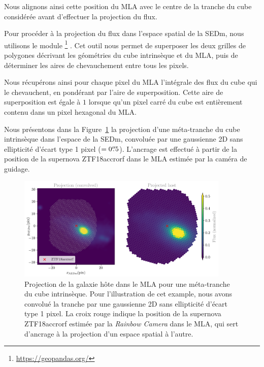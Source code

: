 \documentclass[../main/main.tex]{subfiles}
\begin{document}
Nous alignons ainsi cette position du MLA avec le centre de la tranche
du cube considérée avant d'effectuer la projection du flux.

Pour procéder à la projection du flux dans l'espace spatial de la SEDm,
nous utilisons le module
\footnote{\url{https://geopandas.org/}}
\citep{kelsey_jordahl_2020_3946761}.
Cet outil nous permet de superposer les deux grilles de polygones
décrivant les géométries du cube intrinsèque et du MLA, puis de
déterminer les aires de chevauchement entre tous les pixels. 

Nous récupérons ainsi pour chaque pixel du MLA l'intégrale des flux
du cube qui le chevauchent, en pondérant
par l'aire de superposition. Cette aire de superposition est égale à $1$
lorsque qu'un pixel carré du cube est entièrement contenu dans un pixel
hexagonal du MLA.

Nous présentons dans la Figure~\ref{fig:projecthost} la projection d'une
méta-tranche du cube intrinsèque dans l'espace de la SEDm, convoluée par
une gaussienne 2D sans ellipticité d'écart type 1 pixel ($=0\overset{\prime\prime}{.}5$). L'ancrage est effectué à
partir de la position de la supernova ZTF18accrorf dans le MLA estimée
par la caméra de guidage. 

\begin{figure}[ht]
  \centering
  \includegraphics[width=0.9\textwidth]{../figures/07_scene/projecthost.png}
  \caption[Projection de la galaxie hôte dans le MLA.]{Projection de la
    galaxie hôte dans le MLA pour une méta-tranche du cube
    intrinsèque. Pour l'illustration de cet example, nous avons convolué la tranche par une
    gaussienne 2D sans ellipticité d'écart type 1 pixel. La croix rouge indique la position de la supernova
    ZTF18accrorf estimée par la \textit{Rainbow Camera} dans le MLA, qui
    sert d'ancrage à la projection d'un espace spatial à l'autre.}
  \label{fig:projecthost}
\end{figure}
\end{document}
